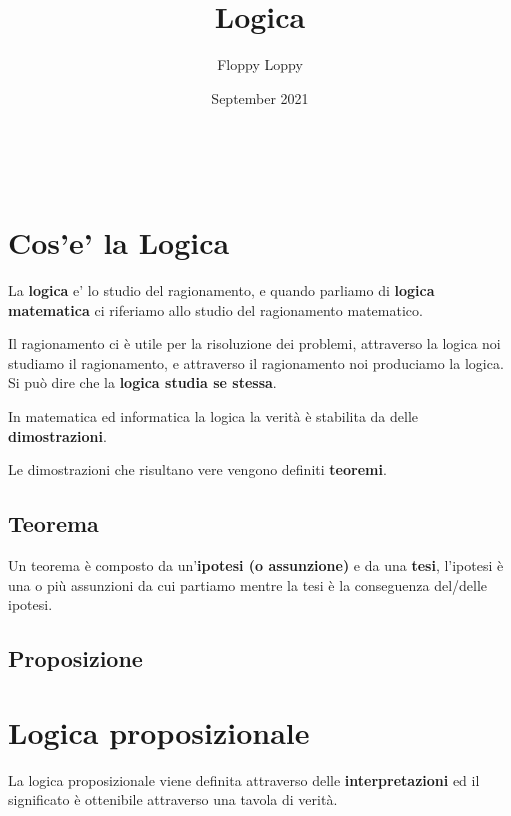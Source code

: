 \documentclass{article}
\begin{document}
\title{Logica}
\author{Floppy Loppy}
\date{September 2021}

\maketitle
\tableofcontents
\listoftodos\



\newpage
\section{Cos'e' la Logica}
La \textbf{logica} e' lo studio del ragionamento, e quando parliamo di \textbf{logica matematica} ci riferiamo allo studio del ragionamento matematico. \par
Il ragionamento ci è utile per la risoluzione dei problemi, attraverso la logica noi studiamo il ragionamento, e attraverso il ragionamento noi produciamo la logica. Si può dire che la \textbf{logica studia se stessa}.\par
In matematica ed informatica la logica la verità è stabilita da delle \textbf{dimostrazioni}. \par
Le dimostrazioni che risultano vere vengono definiti \textbf{teoremi}.


\subsection{Teorema}
Un teorema è composto da un'\textbf{ipotesi (o assunzione)} e da una \textbf{tesi}, l'ipotesi è  una o più assunzioni da cui partiamo mentre la tesi è la conseguenza del/delle ipotesi.


\subsection{Proposizione}




\newpage
\section{Logica proposizionale}
La logica proposizionale viene definita attraverso delle \textbf{interpretazioni} ed il significato è ottenibile attraverso una tavola di verità. \par




\newpage
\end{document}
